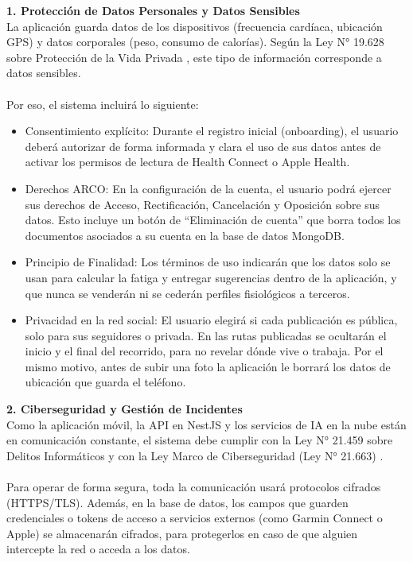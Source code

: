 \textbf{1. Protección de Datos Personales y Datos Sensibles}\\
La aplicación guarda datos de los dispositivos (frecuencia cardíaca, ubicación GPS) y datos corporales (peso, consumo de calorías). Según la Ley N° 19.628 sobre Protección de la Vida Privada \citep{ley19628}, este tipo de información corresponde a datos sensibles.
\\\\
Por eso, el sistema incluirá lo siguiente:
\begin{itemize}
    \item Consentimiento explícito: Durante el registro inicial (onboarding), el usuario deberá autorizar de forma informada y clara el uso de sus datos antes de activar los permisos de lectura de Health Connect o Apple Health.
    \item Derechos ARCO: En la configuración de la cuenta, el usuario podrá ejercer sus derechos de Acceso, Rectificación, Cancelación y Oposición sobre sus datos. Esto incluye un botón de ``Eliminación de cuenta'' que borra todos los documentos asociados a su cuenta en la base de datos MongoDB.
    \item Principio de Finalidad: Los términos de uso indicarán que los datos solo se usan para calcular la fatiga y entregar sugerencias dentro de la aplicación, y que nunca se venderán ni se cederán perfiles fisiológicos a terceros.
    \item Privacidad en la red social: El usuario elegirá si cada publicación es pública, solo para sus seguidores o privada. En las rutas publicadas se ocultarán el inicio y el final del recorrido, para no revelar dónde vive o trabaja. Por el mismo motivo, antes de subir una foto la aplicación le borrará los datos de ubicación que guarda el teléfono.
\end{itemize}
\textbf{2. Ciberseguridad y Gestión de Incidentes}\\
Como la aplicación móvil, la API en NestJS y los servicios de IA en la nube están en comunicación constante, el sistema debe cumplir con la Ley N° 21.459 sobre Delitos Informáticos \citep{ley21459} y con la Ley Marco de Ciberseguridad (Ley N° 21.663) \citep{ley21663}.
\\\\
Para operar de forma segura, toda la comunicación usará protocolos cifrados (HTTPS/TLS). Además, en la base de datos, los campos que guarden credenciales o tokens de acceso a servicios externos (como Garmin Connect o Apple) se almacenarán cifrados, para protegerlos en caso de que alguien intercepte la red o acceda a los datos.
